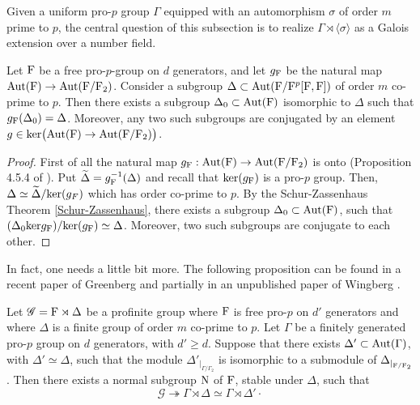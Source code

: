 \documentclass[12pt,a4paper,twoside,english]{smfart}
\def\F{{\rm F}}
\def\N{{\rm N}}
\def\G{{\mathcal G}}
\def\Aut{{\rm Aut}}
\def\ker{{\rm ker}}
\begin{document}
Given a uniform pro-$p$ group $\Gamma$ equipped with an automorphism $\sigma$ of order
$m$ prime to $p$, the central question of this subsection is to realize 
  $\Gamma \rtimes \langle \sigma \rangle$ as a Galois extension over a number field.
  
   
  \begin{prop}\label{relevementlibre} Let  $\F$ be a free pro-$p$-group on $d$ generators, and let
  $g_\F$ be the natural map $\Aut(\F) \to \Aut(\F/\F_2)$.
 Consider a subgroup $\Delta \subset \Aut(\F/\F^p[\F,\F])$ of order $m$ co-prime to $p$. Then  there exists a subgroup $\Delta_0 \subset \Aut(\F)$ isomorphic to $\Delta$ such that $g_\F(\Delta_0)=\Delta$. Moreover, any two such subgroups are conjugated  by an element
 $g \in \ker\big(\Aut(\F) \rightarrow \Aut(\F/\F_2)\big)$.
\end{prop}

 \begin{proof} First of all the  natural map $g_\F: \Aut(\F) \rightarrow \Aut(\F/\F_2)$ is onto (Proposition 4.5.4 of \cite{RZ}).
 Put $\widetilde{\Delta}= g_\F^{-1}(\Delta)$ and recall that $\ker(g_\F)$ is a pro-$p$ group. Then, $\Delta \simeq \widetilde{\Delta}/\ker(g_F)$ which has order co-prime to $p$. By the Schur-Zassenhaus Theorem \ref{Schur-Zassenhaus}, there exists a subgroup $\Delta_0  \subset \Aut(\F)$, such that $(\Delta_0 \ker g_\F)/\ker(g_\F) \simeq \Delta$. Moreover, two such subgroups are conjugate to each other.
\end{proof}         
 
  

In fact, one needs a little bit more. The following proposition can be found in a recent paper of Greenberg \cite{Greenberg} and partially in an unpublished paper of Wingberg \cite{wingberg}.


\begin{prop}\label{wingberg1}
 Let $\G=\F \rtimes \Delta $  be a profinite group where $\F$ is free pro-$p$ on $d'$ generators and where $\Delta$ is a finite group  of order $m$ co-prime to $p$. Let $\Gamma$ be a finitely generated pro-$p$ group on $d$ generators, with $d'\geq d$. Suppose that there exists  $\Delta' \subset \Aut(\Gamma)$, with $\Delta'\simeq \Delta$, such that the module $\Delta'_{|_{\Gamma/\Gamma_2}}$ is isomorphic to a submodule of $\Delta_{|_{\F/\F_2}}$. Then there exists  a normal subgroup $\N$ of $\F$, stable under $\Delta$, such that $$\G \twoheadrightarrow \Gamma \rtimes \Delta \simeq \Gamma \rtimes \Delta'\cdot$$ 
\end{prop}
\end{document}
